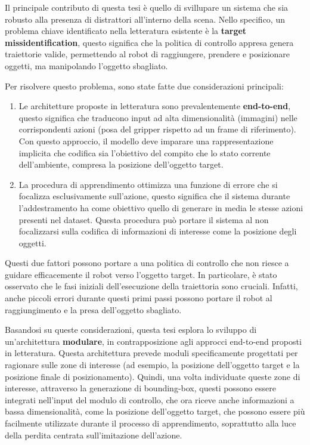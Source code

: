 Il principale contributo di questa tesi è quello di svillupare un sistema che sia robusto alla presenza di distrattori all'interno della scena. Nello specifico, un problema chiave identificato nella letteratura esistente è la \textbf{target missidentification}, questo significa che la politica di controllo appresa genera traiettorie valide, permettendo al robot di raggiungere, prendere e posizionare oggetti, ma manipolando l'oggetto sbagliato.

Per risolvere questo problema, sono state fatte due considerazioni principali:

\begin{enumerate}[label=\textbf{(\arabic*)}] \item Le architetture proposte in letteratura sono prevalentemente \textbf{end-to-end}, questo significa che traducono input ad alta dimensionalità (immagini) nelle corrispondenti azioni (posa del gripper rispetto ad un frame di riferimento). Con questo approccio, il modello deve imparare una rappresentazione implicita che codifica sia l'obiettivo del compito che lo stato corrente dell'ambiente, compresa la posizione dell'oggetto target. \item La procedura di apprendimento ottimizza una funzione di errore che si focalizza esclusivamente sull'azione, questo significa che il sistema durante l'addestramento ha come obiettivo quello di generare in media le stesse azioni presenti nel dataset. Questa procedura può portare il sistema al non focalizzarsi sulla codifica di informazioni di interesse come la posizione degli oggetti. \end{enumerate}

Questi due fattori possono portare a una politica di controllo che non riesce a guidare efficacemente il robot verso l'oggetto target. In particolare, è stato osservato che le fasi iniziali dell'esecuzione della traiettoria sono cruciali. Infatti, anche piccoli errori durante questi primi passi possono portare il robot al raggiungimento e la presa dell'oggetto sbagliato.

Basandosi su queste considerazioni, questa tesi esplora lo sviluppo di un'architettura \textbf{modulare}, in contrapposizione agli approcci end-to-end proposti in letteratura. Questa architettura prevede moduli specificamente progettati per ragionare sulle zone di interesse (ad esempio, la posizione dell'oggetto target e la posizione finale di posizionamento). Quindi, una volta individuate queste zone di interesse, attraverso la generazione di bounding-box, questi possono essere integrati nell'input del modulo di controllo, che ora riceve anche informazioni a bassa dimensionalità, come la posizione dell'oggetto target, che possono essere più facilmente utilizzate durante il processo di apprendimento, soprattutto alla luce della perdita centrata sull'imitazione dell'azione.

